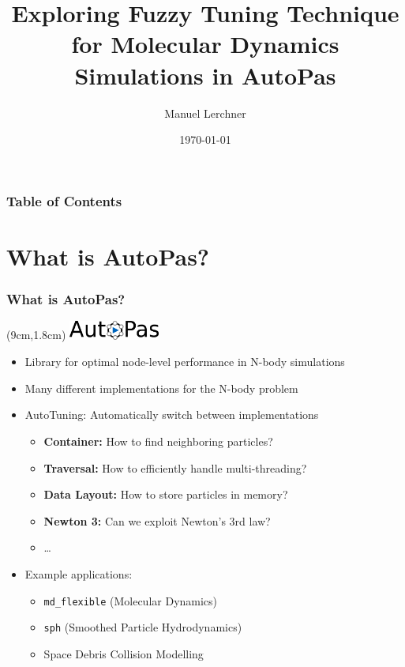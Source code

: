 \documentclass[
	10pt,
	t		%
]{beamer}
\title{Exploring Fuzzy Tuning Technique for Molecular Dynamics Simulations in AutoPas}
\author{Manuel Lerchner}
\date{\today}
\begin{document}
\maketitle
\thispagestyle{empty}

\begin{frame}[noframenumbering]
	\frametitle{Table of Contents}
	\tableofcontents
\end{frame}

\setcounter{framenumber}{0}


\section{What is AutoPas?}
\begin{frame}
	\frametitle{What is AutoPas?}

	\begin{textblock*}{5cm}(9cm,1.8cm)
		\includegraphics[width=3cm]{figures/AutoPasLogo}
	\end{textblock*}


	\begin{itemize}
		\item Library for optimal node-level performance in N-body simulations
		\item Many different implementations for the N-body problem
		\item AutoTuning: Automatically switch between implementations
		      \begin{itemize}
			      \item \textbf{Container:} How to find neighboring particles?
			      \item \textbf{Traversal:} How to efficiently handle multi-threading?
			      \item \textbf{Data Layout:} How to store particles in memory?
			      \item \textbf{Newton 3:} Can we exploit Newton's 3rd law?
			      \item \dots
		      \end{itemize}
		\item Example applications:
		      \begin{itemize}
			      \item \texttt{md\_flexible} (Molecular Dynamics)
			      \item \texttt{sph} (Smoothed Particle Hydrodynamics)
			      \item Space Debris Collision Modelling
		      \end{itemize}
	\end{itemize}
\end{frame}
\end{document}
